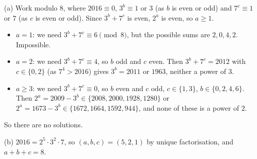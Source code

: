 (a) Work modulo $8$, where $2016\equiv0$, $3^b\equiv1$ or $3$ (as $b$ is even or odd) and $7^c\equiv1$ or $7$ (as $c$ is even or odd). Since $3^b+7^c$ is even, $2^a$ is even, so $a\ge1$.
\begin{itemize}
\item $a=1$: we need $3^b+7^c\equiv6\pmod8$, but the possible sums are $2,0,4,2$. Impossible.
\item $a=2$: we need $3^b+7^c\equiv4$, so $b$ odd and $c$ even. Then $3^b+7^c=2012$ with $c\in\{0,2\}$ (as $7^4>2016$) gives $3^b=2011$ or $1963$, neither a power of $3$.
\item $a\ge3$: we need $3^b+7^c\equiv0$, so $b$ even and $c$ odd, $c\in\{1,3\}$, $b\in\{0,2,4,6\}$. Then $2^a=2009-3^b\in\{2008,2000,1928,1280\}$ or $2^a=1673-3^b\in\{1672,1664,1592,944\}$, and none of these is a power of $2$.
\end{itemize}
So there are no solutions.

(b) $2016=2^5\cdot3^2\cdot7$, so $(a,b,c)=(5,2,1)$ by unique factorisation, and $a+b+c=\boxed{8}$.
